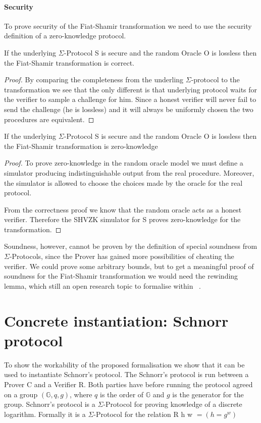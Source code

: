 \paragraph{Security}
To prove security of the Fiat-Shamir transformation we need to use the security
definition of a zero-knowledge protocol.

\begin{lemma}
  If the underlying $\Sigma$-Protocol S is secure and the random Oracle O is
  lossless then the Fiat-Shamir transformation is correct.
\end{lemma}
\begin{proof}
  By comparing the completeness from the underling $\Sigma$-protocol to the
  transformation we see that the only different is that underlying protocol
  waits for the verifier to sample a challenge for him. Since a honest verifier
  will never fail to send the challenge (\ie he is lossless) and it will always
  be uniformly chosen the two procedures are equivalent.
\end{proof}

\begin{lemma}
  If the underlying $\Sigma$-Protocol S is secure and the random Oracle O is
  lossless then the Fiat-Shamir transformation is zero-knowledge
\end{lemma}
\begin{proof}
  To prove zero-knowledge in the random oracle model we must define a simulator
  producing indistinguishable output from the real procedure. Moreover, the
  simulator is allowed to choose the choices made by the oracle for the real
  protocol.

  From the correctness proof we know that the random oracle acts as a honest
  verifier. Therefore the SHVZK simulator for S proves zero-knowledge for the transformation.
\end{proof}

Soundness, however, cannot be proven by the definition of special soundness from
$\Sigma$-Protocols, since the Prover has gained more possibilities of cheating
the verifier. We could prove some arbitrary bounds, but to get a meaningful
proof of soundness for the Fiat-Shamir transformation we would need the
rewinding lemma, which still an open research topic to formalise within \easycrypt\ \cite{ec_intro}.

\section{Concrete instantiation: Schnorr protocol}
\label{sec:schnorr}
To show the workability of the proposed formalisation we show that it can be
used to instantiate Schnorr's protocol.
The Schnorr's protocol is run between a Prover C and a
Verifier R. Both parties have before running the protocol agreed on a group
$(\mathbb{G}, q, g)$, where $q$ is the order of $\mathbb{G}$ and $g$ is the
generator for the group.
Schnorr's protocol is a $\Sigma$-Protocol for proving knowledge of a discrete
logarithm. Formally it is a $\Sigma$-Protocol for the relation R h w $= (h = g^{w})$

